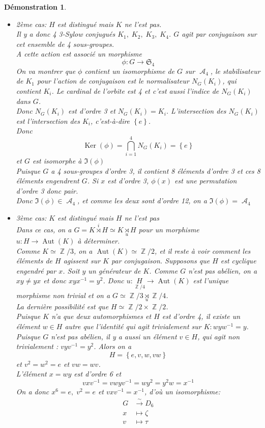 \documentclass[a4paper, oneside]{report}
\theoremstyle{break}
\newtheorem*{demonstration}{Démonstration}
\newcommand{\fong}{\overset{\sim}{\rightarrow}}
\DeclareMathOperator{\Z}{\mathbb{Z}}
\DeclareMathOperator{\A}{\mathcal{A}}
\DeclarePairedDelimiter\ens{\left\{ }{\right\} }%
\DeclareMathOperator{\Ker}{Ker}
\DeclareMathOperator{\Aut}{Aut}
\renewcommand{\ens}[1]{\left\{ #1 \right\} }%
\newcommand{\us}{\underset}
\newcommand{\os}{\overset}
\begin{document}
\begin{demonstration}
\begin{itemize}
\item 2ème cas: $H$ est distingué mais $K$ ne l'est pas.\\
Il y a donc 4 3-Sylow conjugués $K_1, \; K_2, \; K_3, \; K_4$. $G$ agit par conjugaison sur cet ensemble de 4 sous-groupes.\\
A cette action est associé un morphisme
\[
\phi : G \longrightarrow \mathfrak{S}_4
\]
On va montrer que $\phi$ contient un isomorphisme de $G$ sur $\A_4$, le stabilisateur de $K_1$ pour l'action de conjugaison est le normalisateur $N_G(K_i)$, qui contient $K_i$. Le cardinal de l'orbite est 4 et c'est aussi l'indice de $N_G(K_i)$ dans $G$.\\
Donc $N_G(K_i)$ est d'ordre 3 et $N_G(K_i) = K_i$. L'intersection des $N_G(K_i)$ est l'intersection des $K_i$, c'est-à-dire $\ens{e}$.\\
Donc 
\[
\Ker(\phi) = \bigcap_{i = 1}^4 N_G(K_i) = \ens{e}
\]
et $G$ est isomorphe à $\Im(\phi)$\\
Puisque $G$ a 4 sous-groupes d'ordre 3, il contient 8 éléments d'ordre 3 et ces 8 éléments engendrent $G$. Si $x$ est d'ordre 3, $\phi(x)$ est une permutation d'ordre 3 donc pair.\\
Donc $\Im(\phi) \in \A_4$, et comme les deux sont d'ordre 12, on a $\Im(\phi) = \A_4$

\item 3ème cas: $K$ est distingué mais $H$ ne l'est pas\\
Dans ce cas, on a $G = K \os{i}{\rtimes} H \simeq K \us{u}{\rtimes} H$ pour un morphisme $u : H \longrightarrow \Aut(K)$ à déterminer.\\
Comme $K \simeq \Z/3$, on a $\Aut(K) \simeq \Z/2$, et il reste à voir comment les éléments de $H$ agissent sur $K$ par conjugaison. Supposons que $H$ est cyclique engendré par $x$. Soit $y$ un générateur de $K$. Comme $G$ n'est pas abélien, on a $xy \neq yx$ et donc $xyx^{-1} = y^2$. Donc $u : \us{\Z/4}{H} \longrightarrow \Aut(K)$ est l'unique morphisme non trivial et on a $G \simeq \Z/3 \us{u}{\rtimes} \Z/4$.\\
La dernière possibilité est que $H \simeq \Z/2 \times \Z/2$.\\
Puisque $K$ n'a que deux automorphismes et $H$ est d'ordre 4, il existe un élément $w \in H$ autre que l'identité qui agit trivialement sur $K : wyw^{-1} = y$.\\
Puisque $G$ n'est pas abélien, il y a aussi un élément $v \in H$, qui agit non trivialement : $vyv^{-
1} = y^2$. Alors on a 
\[
H = \ens{e, v, w, vw}
\]
et $v^2 = w^2 = e$ et $vw = wv$.\\
L'élément $x = wy$ est d'ordre 6 et
\[
vxv^{-1} = vwyv^{-1} = wy^2 = y^2w = x^{-1}
\]
On a donc $x^6 = e, \; v^2 = e$ et $vxv^{-1} = x^{-1}$, d'où un isomorphisme:
\begin{align*}
G &\fong D_6
\\
x &\mapsto \zeta
\\
v &\mapsto \tau
\end{align*}
\end{itemize}
~
\end{demonstration}
\end{document}
